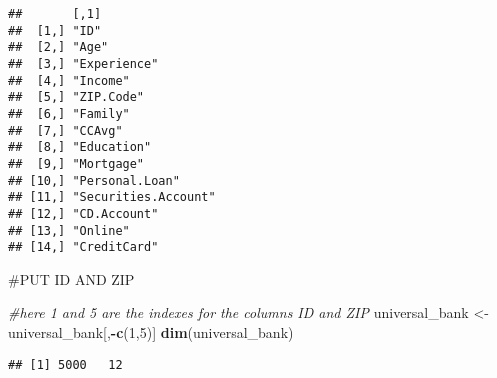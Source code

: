 \documentclass[
]{article}
\newenvironment{Shaded}{\begin{snugshade}}{\end{snugshade}}
\newcommand{\AttributeTok}[1]{\textcolor[rgb]{0.13,0.29,0.53}{#1}}
\newcommand{\CommentTok}[1]{\textcolor[rgb]{0.56,0.35,0.01}{\textit{#1}}}
\newcommand{\DecValTok}[1]{\textcolor[rgb]{0.00,0.00,0.81}{#1}}
\newcommand{\FunctionTok}[1]{\textcolor[rgb]{0.13,0.29,0.53}{\textbf{#1}}}
\newcommand{\NormalTok}[1]{#1}
\newcommand{\OtherTok}[1]{\textcolor[rgb]{0.56,0.35,0.01}{#1}}
\newcommand{\SpecialCharTok}[1]{\textcolor[rgb]{0.81,0.36,0.00}{\textbf{#1}}}
\begin{document}
\begin{verbatim}
##       [,1]                
##  [1,] "ID"                
##  [2,] "Age"               
##  [3,] "Experience"        
##  [4,] "Income"            
##  [5,] "ZIP.Code"          
##  [6,] "Family"            
##  [7,] "CCAvg"             
##  [8,] "Education"         
##  [9,] "Mortgage"          
## [10,] "Personal.Loan"     
## [11,] "Securities.Account"
## [12,] "CD.Account"        
## [13,] "Online"            
## [14,] "CreditCard"
\end{verbatim}

\#PUT ID AND ZIP

\begin{Shaded}
\begin{Highlighting}[]
\CommentTok{\#here 1 and 5 are the indexes for the columns ID and ZIP}
\NormalTok{universal\_bank }\OtherTok{\textless{}{-}}\NormalTok{ universal\_bank[,}\SpecialCharTok{{-}}\FunctionTok{c}\NormalTok{(}\DecValTok{1}\NormalTok{,}\DecValTok{5}\NormalTok{)] }
\FunctionTok{dim}\NormalTok{(universal\_bank)}
\end{Highlighting}
\end{Shaded}

\begin{verbatim}
## [1] 5000   12
\end{verbatim}

\begin{Shaded}
\end{Shaded}
\end{document}
